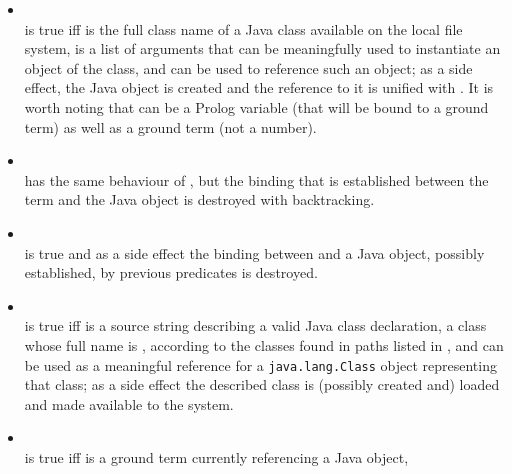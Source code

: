 \begin{itemize}
%
\item {}\\
\noindent{} is true iff
 is the full class name of a Java class available on
the local file system,  is a list of arguments that
can be meaningfully used to instantiate an object of the class,
and  can be used to reference such an object;
%
as a side effect, the Java object is created and the reference to
it is unified with .
%
It is worth noting that  can be a Prolog variable (that
will be bound to a ground term) as well as a ground term (not a
number).\\
%
\item {}\\
\noindent{} has the same behaviour of , but the binding that is established between the  term and the Java object is destroyed with backtracking.\\
%
\item {}\\
\noindent{} is true and as a side effect
the binding between  and a Java object,
possibly established, by previous predicates is destroyed.\\
%
\item {}\\
\noindent{}
is true iff  is a source string describing a
valid Java class declaration, a class whose full name is
, according to the classes found in paths
listed in , and  can be used as a
meaningful reference for a \texttt{java.lang.Class} object
representing that class;
%
as a side effect the described class is (possibly created and)
loaded and made available to the system.\\
%
\item {}\\
\noindent{} is true iff
 is a ground term currently referencing a Java object,

\end{itemize}
